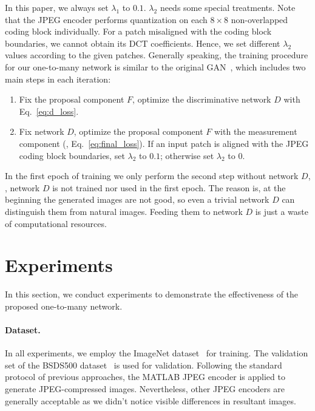 \documentclass[10pt,twocolumn,letterpaper]{article}
\begin{document}
In this paper, we always set $\lambda_1$ to $0.1$. $\lambda_2$ needs some special treatments. Note that the JPEG encoder performs quantization on each $8 \times 8$ non-overlapped coding block individually. For a patch misaligned with the coding block boundaries, we cannot obtain its DCT coefficients. Hence, we set different $\lambda_2$ values according to the given patches. Generally speaking, the training procedure for our one-to-many network is similar to the original GAN~\cite{gan}, which includes two main steps in each iteration:
\begin{enumerate}
\item Fix the proposal component $F$, optimize the discriminative network $D$ with Eq.~\eqref{eq:d_loss}.
\item Fix network $D$, optimize the proposal component $F$ with the measurement component (\ie, Eq.~\eqref{eq:final_loss}). If an input patch is aligned with the JPEG coding block boundaries, set $\lambda_2$ to $0.1$; otherwise set $\lambda_2$ to $0$.
\end{enumerate}
In the first epoch of training we only perform the second step without network $D$, \ie, network $D$ is not trained nor used in the first epoch. The reason is, at the beginning the generated images are not good, so even a trivial network $D$ can distinguish them from natural images. Feeding them to network $D$ is just a waste of computational resources.

\section{Experiments}
In this section, we conduct experiments to demonstrate the effectiveness of the proposed one-to-many network.

\paragraph{Dataset.}
In all experiments, we employ the ImageNet dataset~\cite{imagenet} for training. The validation set of the BSDS500 dataset~\cite{bsds500} is used for validation. Following the standard protocol of previous approaches, the MATLAB JPEG encoder is applied to generate JPEG-compressed images. Nevertheless, other JPEG encoders are generally acceptable as we didn't notice visible differences in resultant images. 
\end{document}
